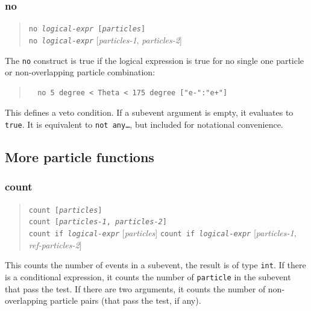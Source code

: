 \documentclass[12pt]{book}
\newcommand{\ttt}[1]{\texttt{#1}}
\begin{document}
\subsubsection{no}
\begin{quote}
\begin{footnotesize}
  \ttt{no \textit{logical-expr} [\textit{particles}]} \\
  \ttt{no \textit{logical-expr}} [\textit{particles-1}, \textit{particles-2}]
\end{footnotesize}
\end{quote}
The \ttt{no} construct is true if the logical expression is true for no single
one particle or non-overlapping particle combination:
\begin{quote}
\begin{footnotesize}
\begin{verbatim}
  no 5 degree < Theta < 175 degree ["e-":"e+"]
\end{verbatim}
\end{footnotesize}
\end{quote}
This defines a veto condition.  If a subevent argument is empty, it
evaluates to \ttt{true}.  It is equivalent to \ttt{not any\ldots}, but
included for notational convenience.


\subsection{More particle functions}

\subsubsection{count}
\begin{quote}
\begin{footnotesize}
  \ttt{count [\textit{particles}]} \\
  \ttt{count [\textit{particles-1}, \textit{particles-2}]} \\
  \ttt{count if \textit{logical-expr}} [\textit{particles}]
  \ttt{count if \textit{logical-expr}} [\textit{particles-1}, \textit{ref-particles-2}]
\end{footnotesize}
\end{quote}
This counts the number of events in a subevent, the result is of type
\ttt{int}.  If there is a conditional expression, it counts the number of
\ttt{particle} in the subevent that pass the test.   If there are two
arguments, it counts the number of non-overlapping particle pairs (that pass
the test, if any).
\end{document}

